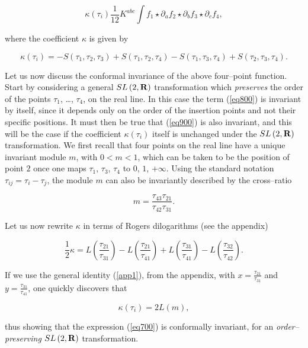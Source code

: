 \documentclass[a4paper,11pt]{article}
\newcommand{\mathbb}[1]{{\bf{#1}}}
\begin{document}
\begin{equation}
\kappa \left( \tau _{i}\right) \frac{1}{12}K^{abc}\int f_{1}\star \partial
_{a}f_{2}\star \partial _{b}f_{3}\star \partial _{c}f_{4},  \label{eq900}
\end{equation}

\noindent
where the coefficient $\kappa$ is given by 

$$
\kappa \left( \tau _{i}\right) =-S\left( \tau _{1},\tau _{2},\tau
_{3}\right) +S\left( \tau _{1},\tau _{2},\tau _{4}\right) -S\left( \tau
_{1},\tau _{3},\tau _{4}\right) +S\left( \tau _{2},\tau _{3},\tau
_{4}\right) .
$$

Let us now discuss the conformal invariance of the above four--point
function. Start by considering a general $SL\left( 2,\mathbb{R}\right)$
transformation which \textit{preserves} the order of the points 
$\tau_{1}$, \dots, $\tau _{4}$, on the real line. In this case the term 
(\ref{eq800}) is invariant by itself, since it depends only on the order of 
the insertion points and not their specific positions. It must then be true 
that (\ref{eq900}) is also invariant, and this will be the case if 
the coefficient $\kappa\left( \tau _{i}\right) $ itself is unchanged under 
the $SL\left( 2,\mathbb{R}\right) $ transformation. We first recall that 
four points on the real line have a unique invariant module $m$, with 
$0<m<1$, which can be taken to be the position of point $2$ once one maps 
$\tau _{1}$, $\tau _{3}$, $\tau _{4}$ to $0$, $1$, $+\infty$. Using the 
standard notation $\tau _{ij}=\tau _{i}-\tau _{j}$, the module $m$ can also 
be invariantly described by the cross--ratio 

$$
m=\frac{\tau _{43}\tau _{21}}{\tau _{42}\tau _{31}}.
$$

\noindent
Let us now rewrite $\kappa $ in terms of Rogers dilogarithms (see the 
appendix)

$$
\frac{1}{2}\kappa =L\left( \frac{\tau _{21}}{\tau _{31}}\right) -L\left( 
\frac{\tau _{21}}{\tau _{41}}\right) +L\left( \frac{\tau _{31}}{\tau _{41}} 
\right) -L\left( \frac{\tau _{32}}{\tau _{42}}\right) .
$$

\noindent
If we use the general identity (\ref{app1}), from the appendix, with 
$x=\frac{\tau _{21}}{\tau_{31}}$ and $y=\frac{\tau _{31}}{\tau _{41}}$, 
one quickly discovers that 

$$
\kappa \left( \tau _{i}\right) =2L\left( m\right) ,
$$

\noindent
thus showing that the expression (\ref{eq700}) is conformally invariant, for 
an \textit{order--preserving} $SL\left( 2,\mathbb{R}\right)$ transformation.
\end{document}
